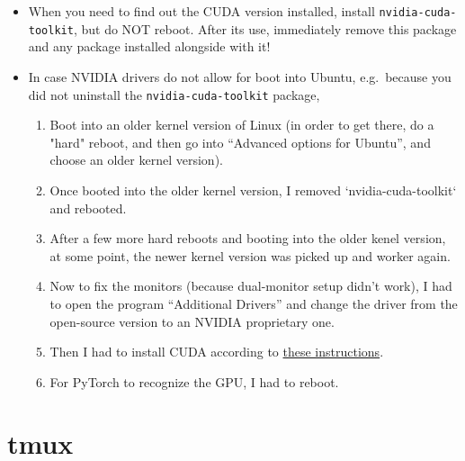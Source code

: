 \documentclass[12pt, a4paper]{scrbook}
\numberwithin{equation}{section}
\theoremstyle{definition}
\theoremstyle{definition}
\begin{document}
	\begin{itemize}
		\item When you need to find out the CUDA version installed, install \texttt{nvidia-cuda-toolkit}, but do NOT reboot. After its use, immediately remove this package and any package installed alongside with it!
		
		\item In case NVIDIA drivers do not allow for boot into Ubuntu, e.g.~because you did not uninstall the \texttt{nvidia-cuda-toolkit} package,
		
		\begin{enumerate}
			\item Boot into an older kernel version of Linux (in order to get there, do a "hard" reboot, and then go into 
			\enquote{Advanced options for Ubuntu}, and choose an older kernel version). 
			\item Once booted into the older kernel version, I removed `nvidia-cuda-toolkit` and rebooted. 
			\item After a few more hard reboots and booting into the older kenel version, at some point, the newer kernel 
			version was picked up and worker again. 
			\item Now to fix the monitors (because dual-monitor setup didn't work), I had to open the program 
			\enquote{Additional Drivers} and change the driver from the open-source version to an NVIDIA proprietary one. 
			\item Then I had to install CUDA according to \href{https://docs.nvidia.com/cuda/cuda-installation-guide-linux/index.html}{these instructions}. 
			\item For PyTorch to recognize the GPU, I had to reboot. 
		\end{enumerate}
		
	\end{itemize}

	\section{tmux}
	
\end{document}
